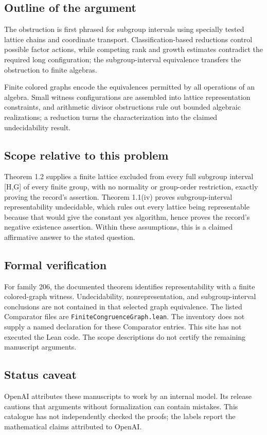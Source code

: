 \documentclass[11pt]{article}
\begin{document}
\subsection{Outline of the argument}
The obstruction is first phrased for subgroup intervals using specially tested lattice chains and coordinate transport. Classification-based reductions control possible factor actions, while competing rank and growth estimates contradict the required long configuration; the subgroup-interval equivalence transfers the obstruction to finite algebras.

Finite colored graphs encode the equivalences permitted by all operations of an algebra. Small witness configurations are assembled into lattice representation constraints, and arithmetic divisor obstructions rule out bounded algebraic realizations; a reduction turns the characterization into the claimed undecidability result.

\subsection{Scope relative to this problem}
Theorem 1.2 supplies a finite lattice excluded from every full subgroup interval [H,G] of every finite group, with no normality or group-order restriction, exactly proving the record’s assertion. Theorem 1.1(iv) proves subgroup-interval representability undecidable, which rules out every lattice being representable because that would give the constant yes algorithm, hence proves the record’s negative existence assertion. Within these assumptions, this is a claimed affirmative answer to the stated question.

\subsection{Formal verification}
For family 206, the documented theorem identifies representability with a finite colored-graph witness. Undecidability, nonrepresentation, and subgroup-interval conclusions are not contained in that selected graph equivalence. The listed Comparator files are \texttt{FiniteCongruenceGraph.lean}. The inventory does not supply a named declaration for these Comparator entries. This site has not executed the Lean code. The scope descriptions do not certify the remaining manuscript arguments.

\subsection{Status caveat}
OpenAI attributes these manuscripts to work by an internal model. Its release cautions that arguments without formalization can contain mistakes. This catalogue has not independently checked the proofs; the labels report the mathematical claims attributed to OpenAI.
\end{document}
